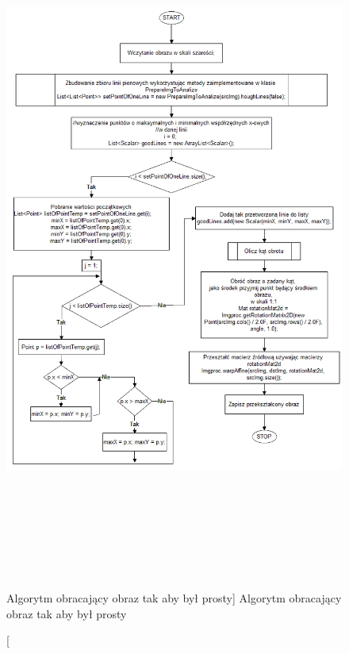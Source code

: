 \documentclass[a4paper,12pt]{article}
\begin{document}
        		 
        		 
        		 
		        \newpage
        		 \begin{figure}[!ht]  
                    \begin{center}
        	    	    \includegraphics[height=22.5cm]{image//algorithm//toStraightenUp.png} 
    			    \end{center}
        		    \caption
            			[Algorytm obracający obraz tak aby był prosty]  
            			{Algorytm obracający obraz tak aby był prosty} 
            			\label{fig:straightenUp}
        	    \end{figure}
        		 \newpage
		    
\end{document}
